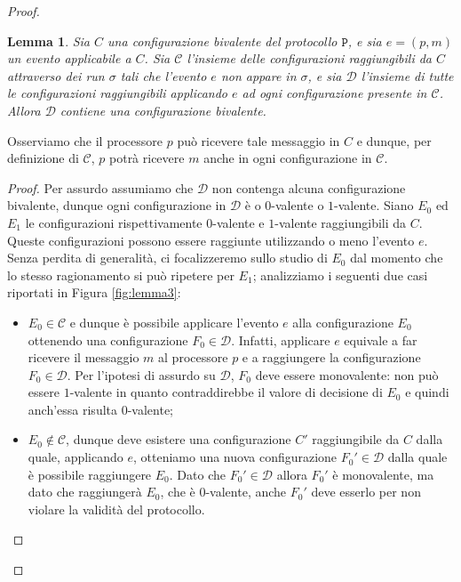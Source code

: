 \documentclass{article}
\newtheorem{lemma}{Lemma}
\begin{document}
\begin{proof}
\begin{lemma}
\label{lemma:oneStepFromConfigInCYieldConfigInD}
Sia $C$ una configurazione bivalente del protocollo $\mathtt{P}$, e sia
$e=(p,m)$ un evento applicabile a $C$. Sia $\mathcal{C}$ l'insieme
delle configurazioni raggiungibili da $C$ attraverso dei run $\sigma$
tali che l'evento $e$ non appare in $\sigma$, e sia $\mathcal{D}$
l'insieme di tutte le configurazioni raggiungibili applicando $e$ ad
ogni configurazione presente in $\mathcal{C}$. Allora $\mathcal{D}$
contiene una configurazione bivalente.
\end{lemma}
Osserviamo che il processore $p$ può ricevere tale messaggio in $C$ e
dunque, per definizione di $\mathcal{C}$, $p$ potrà ricevere $m$ anche
in ogni configurazione in $\mathcal{C}$.
\begin{proof}
  Per assurdo assumiamo che $\mathcal{D}$ non contenga alcuna
  configurazione bivalente, dunque ogni configurazione in
  $\mathcal{D}$ è o $0$-valente o $1$-valente. Siano $E_0$ ed $E_1$ le
  configurazioni rispettivamente $0$-valente e $1$-valente
  raggiungibili da $C$. Queste configurazioni possono essere raggiunte
  utilizzando o meno l'evento $e$. Senza perdita di generalità, ci
  focalizzeremo sullo studio di $E_0$ dal momento che lo stesso
  ragionamento si può ripetere per $E_1$; analizziamo i seguenti due
  casi riportati in Figura \ref{fig:lemma3}:


\begin{itemize}
\item $E_0 \in \mathcal{C}$ e dunque è possibile applicare l'evento
  $e$ alla configurazione $E_0$ ottenendo una configurazione $F_0 \in
  \mathcal{D}$. Infatti, applicare $e$ equivale a far ricevere il
  messaggio $m$ al processore $p$ e a raggiungere la configurazione
  $F_0 \in \mathcal{D}$. Per l'ipotesi di assurdo su $\mathcal{D}$,
  $F_0$ deve essere monovalente: non può essere $1$-valente in quanto
  contraddirebbe il valore di decisione di $E_0$ e quindi anch'essa
  risulta $0$-valente;
\item $E_0 \not \in \mathcal{C}$, dunque deve esistere una
  configurazione $C'$ raggiungibile da $C$ dalla quale, applicando
  $e$, otteniamo una nuova configurazione $F_0' \in \mathcal{D}$ dalla
  quale è possibile raggiungere $E_0$. Dato che $F_0' \in \mathcal{D}$
  allora $F_0'$ è monovalente, ma dato che raggiungerà $E_0$, che è
  $0$-valente, anche $F_0'$ deve esserlo per non violare la validità
  del protocollo.
\end{itemize}



\end{proof}
\end{proof}
\end{document}
